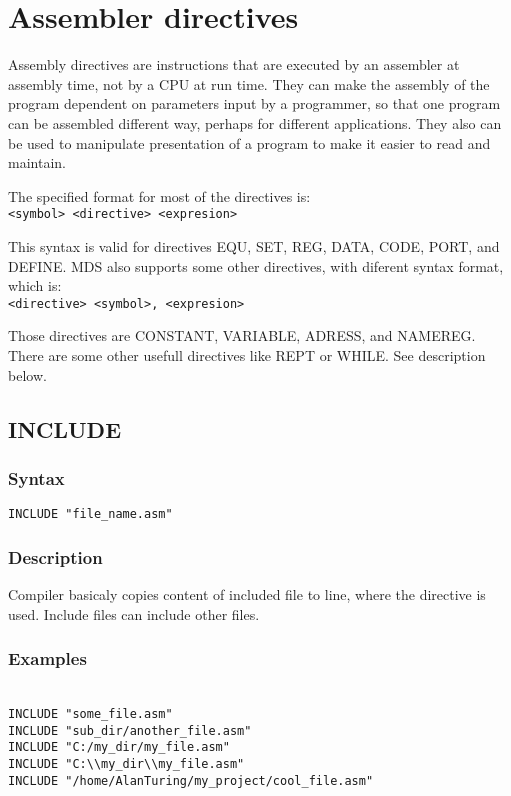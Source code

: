 \section{Assembler directives}
    Assembly directives are instructions that are executed by an assembler at assembly time, not by a CPU at run time. They can make the assembly of the program dependent on parameters input by a programmer, so that one program can be assembled different way, perhaps for different applications. They also can be used to manipulate presentation of a program to make it easier to read and maintain.

    The specified format for most of the directives is:
    {
        ~\\
        \usecodefont
        \verb'<symbol> <directive> <expresion>'
    }

    \bigskip

    This syntax is valid for directives EQU, SET, REG, DATA, CODE, PORT, and DEFINE. MDS also supports some other directives, with diferent syntax format, which is:
    {
        ~\\
        \usecodefont
        \verb'<directive> <symbol>, <expresion>'
    }

    \bigskip

    Those directives are CONSTANT, VARIABLE, ADRESS, and NAMEREG. There are some other usefull directives like REPT or WHILE. See description below.

    \clearpage
    \subsection{INCLUDE}
        \subsubsection{Syntax}
            \verb'INCLUDE "file_name.asm"'

        \subsubsection{Description}
            Compiler basicaly copies content of included file to line, where the directive is used. Include files can include other files.

        \subsubsection{Examples}
        {
            ~\\
            \usecodefont
            \verb'INCLUDE "some_file.asm"'\\
            \verb'INCLUDE "sub_dir/another_file.asm"'\\
            \verb'INCLUDE "C:/my_dir/my_file.asm"'\\
            \verb'INCLUDE "C:\\my_dir\\my_file.asm"'\\
            \verb'INCLUDE "/home/AlanTuring/my_project/cool_file.asm"'\\
        }

